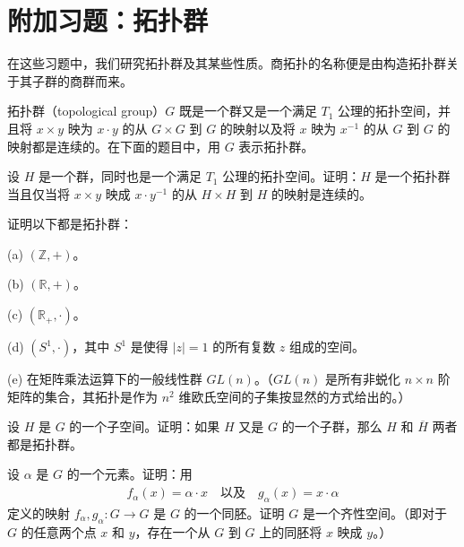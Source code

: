 \documentclass[../../main.tex]{subfiles}
\begin{document}
\section*{附加习题：拓扑群}\label{section:ch02-附加习题拓扑群}


在这些习题中，我们研究拓扑群及其某些性质。商拓扑的名称便是由构造拓扑群关于其子群的商群而来。

拓扑群（topological group）$G$ 既是一个群又是一个满足 $T_{1}$ 公理的拓扑空间，并且将 $x \times y$ 映为 $x \cdot y$ 的从 $G \times G$ 到 $G$ 的映射以及将 $x$ 映为 $x^{-1}$ 的从 $G$ 到 $G$ 的映射都是连续的。在下面的题目中，用 $G$ 表示拓扑群。

\begin{exercise}\label{exercise:ch02-附加习题-1}
设 $H$ 是一个群，同时也是一个满足 $T_{1}$ 公理的拓扑空间。证明：$H$ 是一个拓扑群当且仅当将 $x \times y$ 映成 $x \cdot y^{-1}$ 的从 $H \times H$ 到 $H$ 的映射是连续的。
\end{exercise}

\begin{exercise}\label{exercise:ch02-附加习题-2}
证明以下都是拓扑群：

(a) $(\mathbb{Z}, +)$。

(b) $(\mathbb{R}, +)$。

(c) $(\mathbb{R}_{+}, \cdot)$。

(d) $(S^{1}, \cdot)$，其中 $S^{1}$ 是使得 $|z| = 1$ 的所有复数 $z$ 组成的空间。

(e) 在矩阵乘法运算下的一般线性群 $GL(n)$。（$GL(n)$ 是所有非蜕化 $n \times n$ 阶矩阵的集合，其拓扑是作为 $n^{2}$ 维欧氏空间的子集按显然的方式给出的。）
\end{exercise}

\begin{exercise}\label{exercise:ch02-附加习题-3}
设 $H$ 是 $G$ 的一个子空间。证明：如果 $H$ 又是 $G$ 的一个子群，那么 $H$ 和 $\overline{H}$ 两者都是拓扑群。
\end{exercise}

\begin{exercise}\label{exercise:ch02-附加习题-4}
设 $\alpha$ 是 $G$ 的一个元素。证明：用
\begin{align*}
f_{\alpha}(x) = \alpha \cdot x \quad \text{以及} \quad g_{\alpha}(x) = x \cdot \alpha
\end{align*}
定义的映射 $f_{\alpha}, g_{\alpha}: G \rightarrow G$ 是 $G$ 的一个同胚。证明 $G$ 是一个齐性空间。（即对于 $G$ 的任意两个点 $x$ 和 $y$，存在一个从 $G$ 到 $G$ 上的同胚将 $x$ 映成 $y$。）
\end{exercise}
\end{document}
